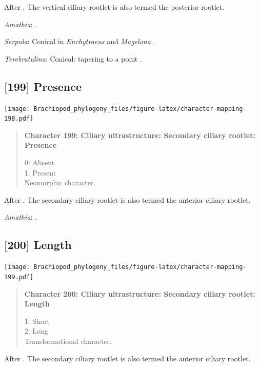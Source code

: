 \documentclass[openany]{book}
\begin{document}
After \citet{Lundin2009}. The vertical ciliary rootlet is also termed
the posterior rootlet.

\hypertarget{Amathia-coding-198}{}
\emph{Amathia}: \citet{Reed1982}.

\hypertarget{Serpula-coding-198}{}
\emph{Serpula}: Conical in \emph{Enchytraeus} \citep{Reger1967} and
\emph{Magelona} \citep{Bartolomaeus1995}.

\hypertarget{Terebratulina-coding-198}{}
\emph{Terebratulina}: Conical: tapering to a point \citep{Luter1995}.

\subsection*{{[}199{]} Presence}\label{presence-5}

\texttt{[image: Brachiopod\_phylogeny\_files/figure-latex/character-mapping-198.pdf]}

\begin{quote}
\textbf{Character 199: Ciliary ultrastructure: Secondary ciliary
rootlet: Presence}

0: Absent\\
1: Present\\
Neomorphic character.
\end{quote}

After \citet{Lundin2009}. The secondary ciliary rootlet is also termed
the anterior ciliary rootlet.

\hypertarget{Amathia-coding-199}{}
\emph{Amathia}: \citet{Reed1982}.

\subsection*{{[}200{]} Length}\label{length-1}

\texttt{[image: Brachiopod\_phylogeny\_files/figure-latex/character-mapping-199.pdf]}

\begin{quote}
\textbf{Character 200: Ciliary ultrastructure: Secondary ciliary
rootlet: Length}

1: Short\\
2: Long\\
Transformational character.
\end{quote}

After \citet{Lundin2009}. The secondary ciliary rootlet is also termed
the anterior ciliary rootlet.
\end{document}

